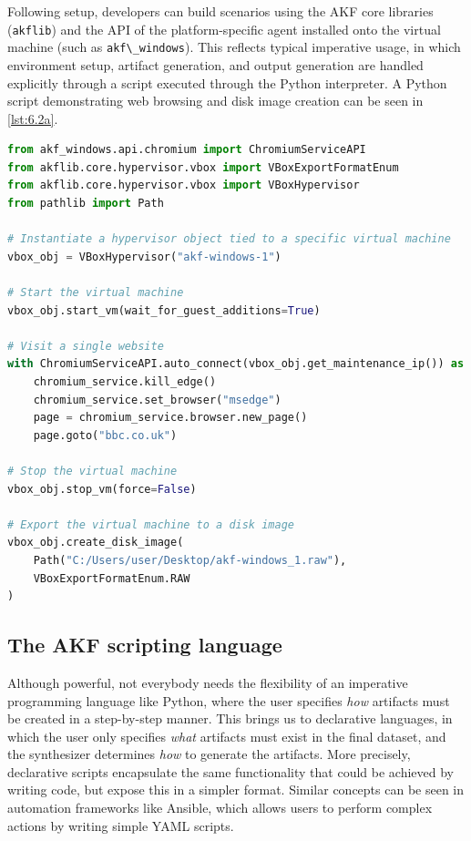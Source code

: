 \documentclass[final,5p,times,twocolumn]{elsarticle}
\newcommand{\passthrough}[1]{#1}
\begin{document}
Following setup, developers can build scenarios using the AKF core
libraries (\passthrough{\lstinline!akflib!}) and the API of the
platform-specific agent installed onto the virtual machine (such as
\passthrough{\lstinline!akf\_windows!}). This reflects typical
imperative usage, in which environment setup, artifact generation, and
output generation are handled explicitly through a script executed
through the Python interpreter. A Python script demonstrating web
browsing and disk image creation can be seen in \autoref{lst:6.2a}.

\begin{lstlisting}[label={lst:6.2a}, caption={Example of an imperative AKF scenario}, language=Python]
from akf_windows.api.chromium import ChromiumServiceAPI
from akflib.core.hypervisor.vbox import VBoxExportFormatEnum
from akflib.core.hypervisor.vbox import VBoxHypervisor
from pathlib import Path

# Instantiate a hypervisor object tied to a specific virtual machine
vbox_obj = VBoxHypervisor("akf-windows-1")

# Start the virtual machine
vbox_obj.start_vm(wait_for_guest_additions=True)

# Visit a single website
with ChromiumServiceAPI.auto_connect(vbox_obj.get_maintenance_ip()) as chromium_service:
    chromium_service.kill_edge()
    chromium_service.set_browser("msedge")
    page = chromium_service.browser.new_page()
    page.goto("bbc.co.uk")

# Stop the virtual machine
vbox_obj.stop_vm(force=False)

# Export the virtual machine to a disk image
vbox_obj.create_disk_image(
    Path("C:/Users/user/Desktop/akf-windows_1.raw"),
    VBoxExportFormatEnum.RAW
)
\end{lstlisting}

\subsection{The AKF scripting
language}\label{the-akf-scripting-language}

Although powerful, not everybody needs the flexibility of an imperative
programming language like Python, where the user specifies \emph{how}
artifacts must be created in a step-by-step manner. This brings us to
declarative languages, in which the user only specifies \emph{what}
artifacts must exist in the final dataset, and the synthesizer
determines \emph{how} to generate the artifacts. More precisely,
declarative scripts encapsulate the same functionality that could be
achieved by writing code, but expose this in a simpler format. Similar
concepts can be seen in automation frameworks like Ansible, which allows
users to perform complex actions by writing simple YAML scripts.
\end{document}
